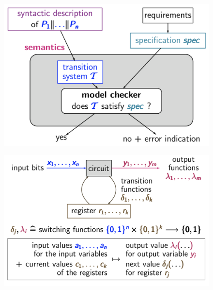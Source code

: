 \documentclass[a4paper, notitlepage, 9pt]{extreport}
\begin{document}
\begin{multicols}{2}
	\begin{figure}[H]
		\centering
		\includegraphics[scale=0.23]{MC}
	\end{figure}
	\columnbreak
	\begin{figure}[H]
		\centering
		\includegraphics[scale=0.25]{MC2}
	\end{figure}
\end{multicols}
\end{document}
